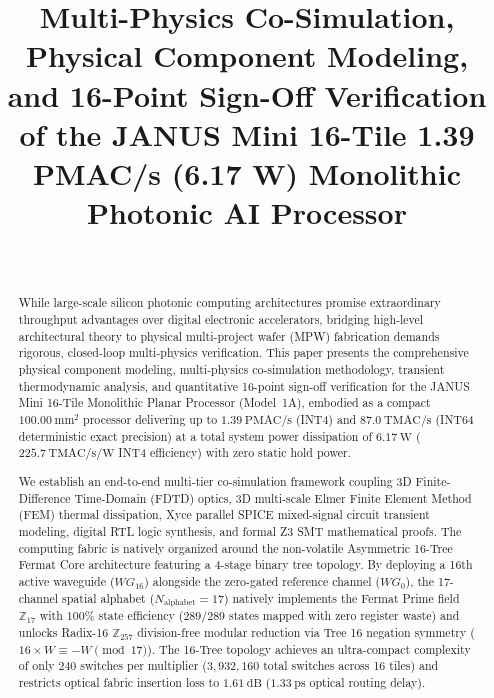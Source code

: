 \documentclass[journal]{IEEEtran}
\title{
Multi-Physics Co-Simulation, Physical Component Modeling, and 16-Point Sign-Off Verification of the JANUS Mini 16-Tile 1.39 PMAC/s (6.17 W) Monolithic Photonic AI Processor
}
\author{
\IEEEauthorblockN{Deepanshu Bhardwaj}\\[2pt]
\IEEEauthorblockA{\small Patent Application No.: 202611052791 (Patent Pending)}
}
\begin{document}
\maketitle

\begin{abstract}
While large-scale silicon photonic computing architectures promise extraordinary throughput advantages over digital electronic accelerators, bridging high-level architectural theory to physical multi-project wafer (MPW) fabrication demands rigorous, closed-loop multi-physics verification. This paper presents the comprehensive physical component modeling, multi-physics co-simulation methodology, transient thermodynamic analysis, and quantitative 16-point sign-off verification for the JANUS Mini 16-Tile Monolithic Planar Processor (Model~1A), embodied as a compact $100.00~\mathrm{mm^2}$ processor delivering up to $1.39~\mathrm{PMAC/s}$ (INT4) and $87.0~\mathrm{TMAC/s}$ (INT64 deterministic exact precision) at a total system power dissipation of $6.17~\mathrm{W}$ ($225.7~\mathrm{TMAC/s/W}$ INT4 efficiency) with zero static hold power.

We establish an end-to-end multi-tier co-simulation framework coupling 3D Finite-Difference Time-Domain (FDTD) optics, 3D multi-scale Elmer Finite Element Method (FEM) thermal dissipation, Xyce parallel SPICE mixed-signal circuit transient modeling, digital RTL logic synthesis, and formal Z3 SMT mathematical proofs. The computing fabric is natively organized around the non-volatile Asymmetric 16-Tree Fermat Core architecture featuring a 4-stage binary tree topology. By deploying a 16th active waveguide ($WG_{16}$) alongside the zero-gated reference channel ($WG_0$), the 17-channel spatial alphabet ($N_{\mathrm{alphabet}} = 17$) natively implements the Fermat Prime field $\mathbb{Z}_{17}$ with $100\%$ state efficiency ($289/289$ states mapped with zero register waste) and unlocks Radix-16 $\mathbb{Z}_{257}$ division-free modular reduction via Tree 16 negation symmetry ($16 \times W \equiv -W \pmod{17}$). The 16-Tree topology achieves an ultra-compact complexity of only $240$ switches per multiplier ($3,932,160$ total switches across 16 tiles) and restricts optical fabric insertion loss to $1.61~\mathrm{dB}$ ($1.33~\mathrm{ps}$ optical routing delay).


\end{abstract}
\end{document}
